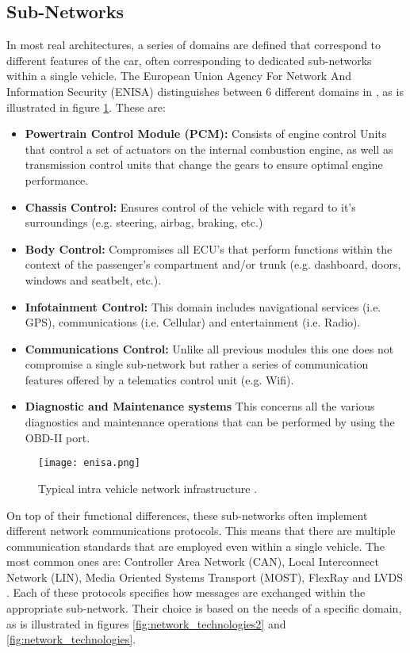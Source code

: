 \subsection{Sub-Networks}
In most real architectures, a series of domains are defined that correspond to different features of the car, often corresponding to dedicated sub-networks within a single vehicle. The European Union Agency For Network And Information Security (ENISA) distinguishes between 6 different domains in \cite{Enisa}, as is illustrated in figure \ref{fig:enisa}. These are:
\begin{itemize}
	\item \textbf{Powertrain Control Module (PCM):} Consists of engine control Units that control a set of actuators on the internal combustion engine, as well as transmission control units that change the gears to ensure optimal engine performance. 
	
	\item \textbf{Chassis Control:} Ensures control of the vehicle with regard to it's surroundings (e.g. steering, airbag, braking, etc.)
	
	\item \textbf{Body Control:} Compromises all ECU's that perform functions within the context of the passenger's compartment and/or trunk (e.g. dashboard, doors, windows and seatbelt, etc.).
	
	\item \textbf{Infotainment Control:} This domain includes navigational services (i.e. GPS), communications (i.e. Cellular) and entertainment (i.e. Radio).
	
	\item \textbf{Communications Control:} Unlike all previous modules this one does not compromise a single sub-network but rather a series of communication features offered by a telematics control unit (e.g. Wifi).
	
	\item \textbf{Diagnostic and Maintenance systems} This concerns all the various diagnostics and maintenance operations that can be performed by using the OBD-II port.
\end{itemize}

\begin{figure}[h]
	\label{fig:enisa}
	\centering
	\texttt{[image: enisa.png]}
	\caption{Typical intra vehicle network infrastructure \cite{Enisa}.}
\end{figure}

On top of their functional differences, these sub-networks often implement different network communications protocols. This means that there are multiple communication standards that are employed even within a single vehicle. The most common ones are: Controller Area Network (CAN), Local Interconnect Network (LIN), Media Oriented Systems Transport (MOST), FlexRay and LVDS \cite{Tuhoy}. Each of these protocols specifies how messages are exchanged within the appropriate sub-network. Their choice is based on the needs of a specific domain, as is illustrated in figures \ref{fig:network_technologies2} and \ref{fig:network_technologies}.

